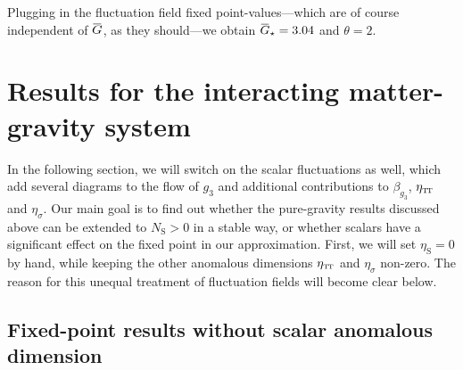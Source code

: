 \documentclass[11pt]{book}
\newcommand{\overbar}[1]{\mkern 1.5mu\overline{\mkern-1.5mu#1\mkern-1.5mu}\mkern 1.5mu}
\newcommand\TTspace{ -1pt }
\newcommand\etaTT{ \eta_{\scriptscriptstyle{\mathrm{T\hspace{\TTspace}T}}} }
\newcommand\etaS{ \eta_{\scriptscriptstyle{\mathrm{S}}} }
\newcommand\NS{ N_{\scriptscriptstyle{\mathrm{S}}} }
\newcommand\Gback{ \overbar{G} } %
\numberwithin{equation}{chapter}
\begin{document}
Plugging in the fluctuation field fixed point-values---which are of course independent
of $\Gback$, as they should---we obtain $\Gback_{\star} = 3.04$ and $\theta=2$.


\section{Results for the interacting matter-gravity system}

In the following section, we will switch on the scalar fluctuations as well,
which add several diagrams to the flow of $g_3$ and additional contributions to
$\beta_{g_3}$, $\etaTT$ and $\eta_{\sigma}$.
Our main goal is to find out whether the pure-gravity results discussed above can be
extended to $\NS>0$ in a stable way,
or whether scalars have a significant effect on the fixed point in our approximation.
First, we will set $\etaS=0$ by hand, while keeping the other anomalous dimensions
$\etaTT$ and $\eta_{\sigma}$ non-zero.
The reason for this unequal treatment of fluctuation fields will become clear below.


\subsection{Fixed-point results without scalar anomalous dimension}
\end{document}
